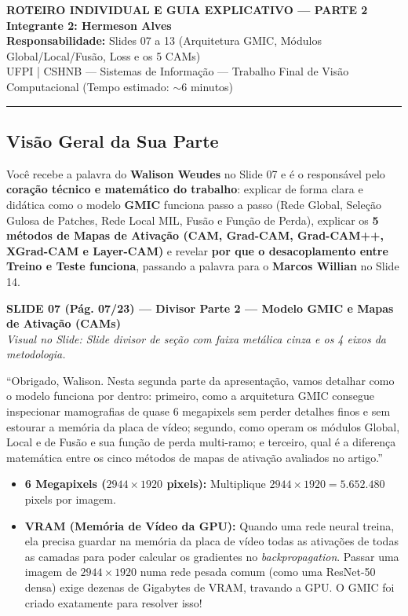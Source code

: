 \documentclass[11pt,a4paper]{article}
\newcommand{\slideheader}[3]{%
    \vspace{10pt}%
    \begin{tcolorbox}[colback=slateborder, colframe=slateborder, coltext=white, boxrule=0pt, arc=3pt, left=8pt, right=8pt, top=5pt, bottom=5pt]
        {\large\bfseries #1 — #2}\\[2pt]
        {\small\itshape Visual no Slide: #3}
    \end{tcolorbox}%
}
\newenvironment{falabox}{%
    \begin{tcolorbox}[colback=speechbg, colframe=speechborder, boxrule=1.2pt, arc=4pt, left=10pt, right=10pt, top=8pt, bottom=8pt, title={\bfseries O QUE VOCÊ DEVE FALAR (Fala Sugerida)}]%
}{%
    \end{tcolorbox}%
}
\newenvironment{explicabox}{%
    \begin{tcolorbox}[colback=explainbg, colframe=explainborder, boxrule=0.8pt, arc=4pt, left=10pt, right=10pt, top=8pt, bottom=8pt, title={\bfseries ENTENDA O QUE VOCÊ ESTÁ FALANDO (Explicação Didática de Cada Termo)}]%
}{%
    \end{tcolorbox}%
}
\begin{document}
\begin{center}
    {\LARGE\bfseries ROTEIRO INDIVIDUAL E GUIA EXPLICATIVO — PARTE 2}\\[6pt]
    {\Large\bfseries Integrante 2: Hermeson Alves}\\[4pt]
    {\normalsize\textbf{Responsabilidade:} Slides 07 a 13 (Arquitetura GMIC, Módulos Global/Local/Fusão, Loss e os 5 CAMs)}\\
    {\small UFPI | CSHNB — Sistemas de Informação — Trabalho Final de Visão Computacional (Tempo estimado: $\sim$6 minutos)}
\end{center}
\hrule
\vspace{6pt}

\subsection*{Visão Geral da Sua Parte}
Você recebe a palavra do \textbf{Walison Weudes} no Slide 07 e é o responsável pelo \textbf{coração técnico e matemático do trabalho}: explicar de forma clara e didática como o modelo \textbf{GMIC} funciona passo a passo (Rede Global, Seleção Gulosa de Patches, Rede Local MIL, Fusão e Função de Perda), explicar os \textbf{5 métodos de Mapas de Ativação (CAM, Grad-CAM, Grad-CAM++, XGrad-CAM e Layer-CAM)} e revelar \textbf{por que o desacoplamento entre Treino e Teste funciona}, passando a palavra para o \textbf{Marcos Willian} no Slide 14.

\slideheader{SLIDE 07 (Pág. 07/23)}{Divisor Parte 2 — Modelo GMIC e Mapas de Ativação (CAMs)}{Slide divisor de seção com faixa metálica cinza e os 4 eixos da metodologia.}

\begin{falabox}
``Obrigado, Walison. Nesta segunda parte da apresentação, vamos detalhar como o modelo funciona por dentro: primeiro, como a arquitetura GMIC consegue inspecionar mamografias de quase 6 megapixels sem perder detalhes finos e sem estourar a memória da placa de vídeo; segundo, como operam os módulos Global, Local e de Fusão e sua função de perda multi-ramo; e terceiro, qual é a diferença matemática entre os cinco métodos de mapas de ativação avaliados no artigo.''
\end{falabox}

\begin{explicabox}
\begin{itemize}[leftmargin=*, itemsep=4pt]
    \item \textbf{6 Megapixels ($2944 \times 1920$ pixels):} Multiplique $2944 \times 1920 = 5.652.480$ pixels por imagem.
    \item \textbf{VRAM (Memória de Vídeo da GPU):} Quando uma rede neural treina, ela precisa guardar na memória da placa de vídeo todas as ativações de todas as camadas para poder calcular os gradientes no \textit{backpropagation}. Passar uma imagem de $2944 \times 1920$ numa rede pesada comum (como uma ResNet-50 densa) exige dezenas de Gigabytes de VRAM, travando a GPU. O GMIC foi criado exatamente para resolver isso!
\end{itemize}
\end{explicabox}
\end{document}
